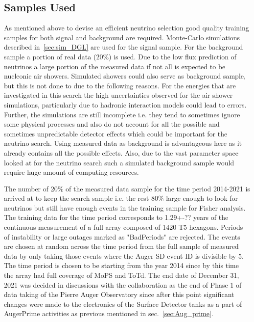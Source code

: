 \subsection{Samples Used}
\label{subsec:nu_sel_samp}

As mentioned above to devise an efficient neutrino selection good quality training samples for both signal and background are required. Monte-Carlo simulations described in~\ref{sec:sim_DGL} are used for the signal sample. For the background sample a portion of real data (20\%) is used. Due to the low flux prediction of neutrinos a large portion of the measured data if not all is expected to be nucleonic air showers. Simulated showers could also serve as background sample, but this is not done to due to the following reasons. For the energies that are investigated in this search the high uncertainties observed for the air shower simulations, particularly due to hadronic interaction models could lead to errors. Further, the simulations are still incomplete i.e. they tend to sometimes ignore some physical processes and also do not account for all the possible and sometimes unpredictable detector effects which could be important for the neutrino search. Using measured data as background is advantageous here as it already contains all the possible effects. Also, due to the vast parameter space looked at for the neutrino search such a simulated background sample would require huge amount of computing resources. 

The number of 20\% of the measured data sample for the time period 2014-2021 is arrived at to keep the search sample i.e. the rest 80\% large enough to look for neutrinos but still have enough events in the training sample for Fisher analysis. The training data for the time period corresponds to 1.29+-?? years of the continuous measurement of a full array composed of 1420 T5 hexagons. Periods of instability or large outages marked as "BadPeriods" are rejected. The events are chosen at random across the time period from the full sample of measured data by only taking those events where the Auger SD event ID is divisible by 5. The time period is chosen to be starting from the year 2014 since by this time the array had full coverage of MoPS and ToTd. The end date of December 31, 2021 was decided in discussions with the collaboration as the end of Phase 1 of data taking of the Pierre Auger Observatory since after this point significant changes were made to the electronics of the Surface Detector tanks as a part of AugerPrime activities as previous mentioned in sec.~\ref{sec:Aug_prime}.

